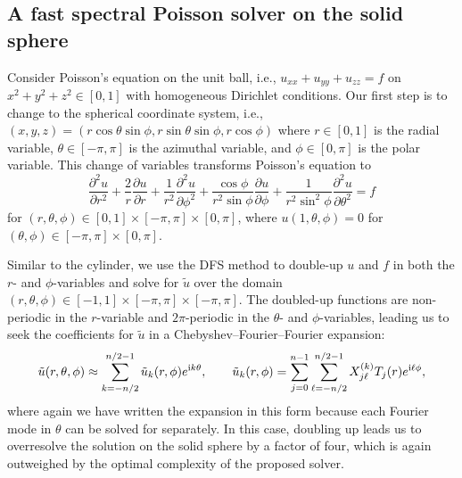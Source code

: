 \subsection{A fast spectral Poisson solver on the solid sphere}\label{sec:\chap:PoissonSphere}
Consider Poisson's equation on the unit ball, i.e., $u_{xx} + u_{yy} + u_{zz} = f$ on $x^2+y^2+z^2 \in[0,1]$ with homogeneous Dirichlet conditions. Our first step is to change to the spherical coordinate system, i.e., $(x,y,z) = (r\cos\theta\sin\phi, r\sin\theta\sin\phi, r\cos\phi)$ where $r\in[0,1]$ is the radial variable, $\theta\in[-\pi,\pi]$ is the azimuthal variable, and $\phi\in[0,\pi]$ is the polar variable. This change of variables transforms Poisson's equation to
\begin{equation}
\frac{\partial^2 u}{\partial r^2} + \frac{2}{r}\frac{\partial u}{\partial r} + \frac{1}{r^2}\frac{\partial^2 u}{\partial \phi^2} + \frac{\cos\phi}{r^2\sin\phi}\frac{\partial u}{\partial \phi} + \frac{1}{r^2\sin^2\phi}\frac{\partial^2 u}{\partial \theta^2} = f
\label{eq:\chap:PoissonSolidSphere}
\end{equation}
for $(r,\theta,\phi)\in [0,1]\times [-\pi,\pi]\times [0,\pi]$, where $u(1,\theta,\phi) = 0$ for $(\theta,\phi)\in[-\pi,\pi]\times [0,\pi]$.

Similar to the cylinder, we use the DFS method to double-up $u$ and $f$ in both the $r$- and $\phi$-variables and solve for $\tilde{u}$ over the domain $(r,\theta,\phi) \in [-1,1] \times [-\pi,\pi] \times [-\pi,\pi]$. The doubled-up functions are non-periodic in the $r$-variable and $2\pi$-periodic in the $\theta$- and $\phi$-variables, leading us to seek the coefficients for $\tilde{u}$ in a Chebyshev--Fourier--Fourier expansion:
\[
\tilde{u}(r,\theta,\phi) \approx \sum_{k=-n/2}^{n/2-1} \tilde{u}_k(r,\phi)e^{{\rm i}k\theta}, \qquad \tilde{u}_k(r,\phi) = \sum_{j=0}^{n-1} \sum_{\ell=-n/2}^{n/2-1} X_{j\ell}^{(k)} T_j(r) e^{{\rm i}\ell\phi},
\]
where again we have written the expansion in this form because each Fourier mode in $\theta$ can be solved for separately. In this case, doubling up leads us to overresolve the solution on the solid sphere by a factor of four, which is again outweighed by the optimal complexity of the proposed solver.

